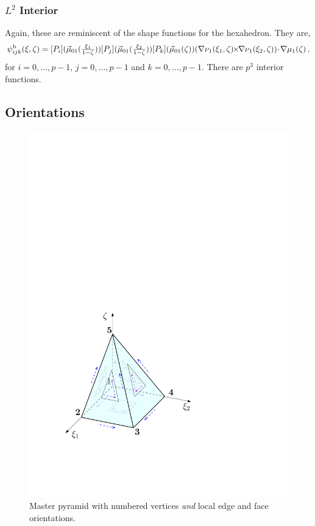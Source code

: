 \subsubsection{\texorpdfstring{$L^2$}{L2} Interior}
Again, these are reminiscent of the shape functions for the hexahedron.
They are,
\begin{equation}
    \psi_{ijk}^\mathrm{b}(\xi,\zeta)=[P_i](\vec{\mu}_{01}(\textstyle{\frac{\xi_1}{1-\zeta}}))[P_j](\vec{\mu}_{01}(\textstyle{\frac{\xi_2}{1-\zeta}}))[P_k](\vec{\mu}_{01}(\zeta))
    	(\nabla\nu_1(\xi_1,\zeta)\!\!\times\!\!\nabla\nu_1(\xi_2,\zeta))\!\cdot\!\nabla\mu_1(\zeta)\,,
    \label{eq:PyrL2Interior}
\end{equation}
for $i=0,\ldots,p-1$, $j=0,\ldots,p-1$ and $k=0,\ldots,p-1$. 
There are $p^3$ interior functions.

\subsection{Orientations}

\begin{figure}[!ht]
\begin{center}
\includegraphics[scale=0.5]{./figures/MasterPyramidOrientations.pdf}
\caption{Master pyramid with numbered vertices \textit{and} local edge and face orientations.}
\label{fig:MasterPyramidOrientations}
\end{center}
\end{figure}

